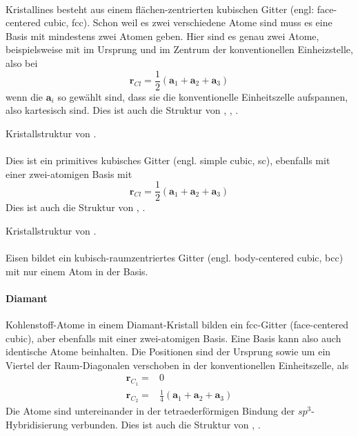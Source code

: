 \paragraph{}
Kristallines  besteht aus einem flächen-zentrierten kubischen Gitter (engl: face-centered cubic, fcc). Schon weil es zwei verschiedene Atome sind muss es eine Basis mit mindestens zwei Atomen geben. Hier sind es genau zwei Atome,  beispielsweise mit  im Ursprung und  im Zentrum der konventionellen Einheizstelle, also bei
\begin{equation}
 \mathbf{r}_{Cl} = \frac{1}{2} \left(\mathbf{a}_1 + \mathbf{a}_2 +  \mathbf{a}_3  \right)
\end{equation}
wenn die $\mathbf{a}_i$ so gewählt sind, dass sie die konventionelle Einheitszelle aufspannen, also kartesisch sind. Dies ist auch die Struktur von , , .


\begin{marginfigure}

\caption{Kristallstruktur von .}
\end{marginfigure}

\paragraph{}
Dies ist ein primitives kubisches Gitter (engl. simple cubic, sc), ebenfalls mit einer zwei-atomigen Basis mit 
\begin{equation}
 \mathbf{r}_{Cl} = \frac{1}{2} \left(\mathbf{a}_1 + \mathbf{a}_2 +  \mathbf{a}_3  \right)
\end{equation}
Dies ist auch die Struktur von , .

\begin{marginfigure}

\caption{Kristallstruktur von .}
\end{marginfigure}

\paragraph{} Eisen bildet ein kubisch-raumzentriertes Gitter (engl. body-centered cubic, bcc) mit nur einem Atom in der Basis.

\paragraph{Diamant} Kohlenstoff-Atome in einem Diamant-Kristall bilden ein fcc-Gitter (face-centered cubic), aber ebenfalls mit einer zwei-atomigen Basis. Eine Basis kann also auch identische Atome beinhalten. Die Positionen sind der Ursprung sowie um ein Viertel der Raum-Diagonalen verschoben in der konventionellen Einheitszelle, als
\begin{align}
 \mathbf{r}_{C_1} = & 0 \\
 \mathbf{r}_{C_2} = & \frac{1}{4} \left(\mathbf{a}_1 + \mathbf{a}_2 +  \mathbf{a}_3  \right)
\end{align}
Die Atome sind untereinander in der tetraederförmigen Bindung der $sp^3$-Hybridisierung verbunden. Dies ist auch die Struktur von , .

